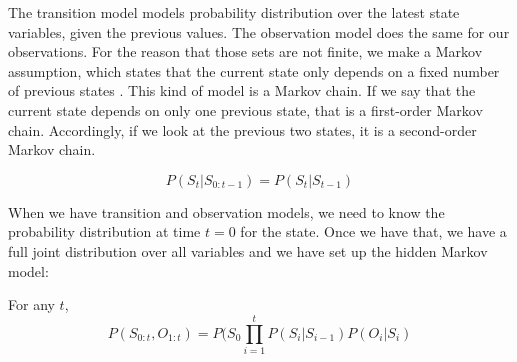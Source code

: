 \documentclass[a4paper]{article}
\begin{document}
The transition model models probability distribution over the latest state variables, given the previous values. The observation model does the same for our observations. For the reason that those sets are not finite, we make a Markov assumption, which states that the current state only depends on a fixed number of previous states \citep{russell2009artificial}. This kind of model is a Markov chain. If we say that the current state depends on only one previous state, that is a first-order Markov chain. Accordingly, if we look at the previous two states, it is a second-order Markov chain.

\begin{equation}
P(S_{t}|S_{0:t-1}) = P(S_{t}|S_{t-1})
\end{equation}

When we have transition and observation models, we need to know the probability distribution at time \ensuremath{t=0} for the state. Once we have that, we have a full joint distribution over all variables and we have set up the hidden Markov model:

For any $t$,
\begin{equation}
P(S_{0:t},O_{1:t})=P(S_{0}\prod_{i=1}^{t}P(S_{i}|S_{i-1})P(O_{i}|S_{i})
\end{equation}
\vskip 0.5cm
\end{document}
